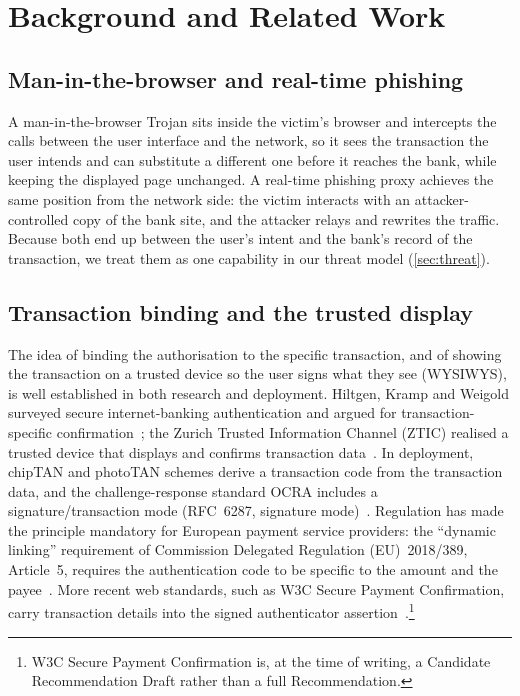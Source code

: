 \section{Background and Related Work}\label{sec:background}

\subsection{Man-in-the-browser and real-time phishing}
A man-in-the-browser Trojan sits inside the victim's browser and intercepts the
calls between the user interface and the network, so it sees the transaction the
user intends and can substitute a different one before it reaches the bank,
while keeping the displayed page unchanged. A real-time phishing proxy achieves
the same position from the network side: the victim interacts with an
attacker-controlled copy of the bank site, and the attacker relays and rewrites
the traffic. Because both end up between the user's intent and the bank's record
of the transaction, we treat them as one capability in our threat model
(\cref{sec:threat}).

\subsection{Transaction binding and the trusted display}
The idea of binding the authorisation to the specific transaction, and of
showing the transaction on a trusted device so the user signs what they see
(WYSIWYS), is well established in both research and deployment. Hiltgen,
Kramp and Weigold surveyed secure internet-banking authentication and argued for
transaction-specific confirmation~\cite{hiltgen2006}; the Zurich Trusted
Information Channel (ZTIC) realised a trusted device that displays and confirms
transaction data~\cite{ztic2008}. In deployment, chipTAN and photoTAN schemes
derive a transaction code from the transaction data, and the challenge-response
standard OCRA includes a signature/transaction mode (RFC~6287, signature
mode)~\cite{rfc6287}. Regulation has made the principle mandatory for European
payment service providers: the ``dynamic linking'' requirement of Commission
Delegated Regulation (EU)~2018/389, Article~5, requires the authentication code
to be specific to the amount and the payee~\cite{eu2018389}. More recent web
standards, such as W3C Secure Payment Confirmation, carry transaction details
into the signed authenticator assertion~\cite{w3cspc}.\footnote{W3C Secure
Payment Confirmation is, at the time of writing, a Candidate Recommendation
Draft rather than a full Recommendation.}

